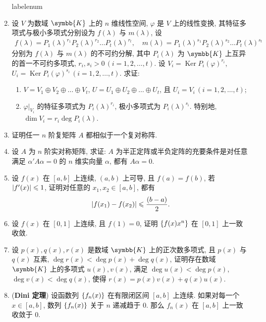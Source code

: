 \documentclass{ctexart}
\makeatletter
\let\set\qty
\let\emph\textbf
\let\le\leqslant
\def\asteriskitem{*}
\def\sitem{%
  \expandafter\let\expandafter\originallabel\csname labelenum\romannumeral\@enumdepth\endcsname
  \expandafter\def\csname labelenum\romannumeral\@enumdepth\expandafter\endcsname\expandafter{%
    \expandafter\bfseries\expandafter\color{red}\expandafter{\expandafter\asteriskitem\expandafter\originallabel}}%
  \item
  \expandafter\let\csname labelenum\romannumeral\@enumdepth\endcsname\originallabel
}
\newcommand{\K}{\ensuremath{\symbb{K}}}
\DeclareMathOperator{\Ker}{Ker}
\makeatother
\begin{document}
\begin{enumerate}[series=exer]
    \sitem 设 $ V $ 为数域 $ \K $ 上的 $ n $ 维线性空间, $ \varphi $ 是 $ V $ 上的线性变换, 其特征多项式与极小多项式分别设为 $ f(\lambda) $ 与 $ m(\lambda) $, 设
    \begin{align*}
        f(\lambda) = P_{1}(\lambda)^{r_{1}}P_{2}(\lambda)^{r_{2}}\dots P_{t}(\lambda)^{r_{t}}, \quad m(\lambda) = P_{1}(\lambda)^{s_{1}}P_{2}(\lambda)^{s_{2}}\dots P_{t}(\lambda)^{s_{t}}
    \end{align*}
    分别为 $ f(\lambda) $ 与 $ m(\lambda) $ 的不可约分解, 其中 $ P_{i}(\lambda) $ 为 $ \K $ 上互异的首一不可约多项式, $ r_{i}, s_{i} > 0\, (i = 1, 2, \dots, t) $. 设 $ V_{i} = \Ker P_{i}(\varphi)^{r_{i}} $, $ U_{i} = \Ker P_{i}(\varphi)^{s_{i}}\,(i = 1, 2, \dots, t) $. 求证:
    \begin{enumerate}
        \item $ V = V_{1} \oplus V_{2} \oplus \dots \oplus V_{t} $, $ U = U_{1} \oplus U_{2} \oplus \dots \oplus U_{t} $, 且 $ U_{i} = V_{i}\,(i = 1, 2, \dots, t) $;
        \item $ \varphi|_{V_{i}} $ 的特征多项式为 $ P_{i}(\lambda)^{r_{i}} $, 极小多项式为 $ P_{i}(\lambda)^{s_{i}} $. 特别地, $ \dim V_{i} = r_{i}\deg P_{i}(\lambda) $. 
    \end{enumerate}
    \item 证明任一 $ n $ 阶复矩阵 $ A $ 都相似于一个复对称阵.
    \item 设 $ A $ 为 $ n $ 阶实对称矩阵, 求证: $ A $ 为半正定阵或半负定阵的充要条件是对任意满足 $ \alpha' A\alpha = 0 $ 的 $ n $ 维实向量 $ \alpha $, 都有 $ A\alpha = 0 $.
    \item 设 $ f(x) $ 在 $ [a, b] $ 上连续, $ (a, b) $ 上可导, 且 $ f(a) = f(b) $, 若 $ \abs{f'(x)} \le 1 $, 证明对任意的 $ x_{1}, x_{2} \in [a, b] $, 都有
    \begin{align*}
        \abs{f(x_{1}) - f(x_{2})} \le \frac{(b - a)}{2}.
    \end{align*}
    \item 设 $ f(x) $ 在 $ [0, 1] $ 上连续, 且 $ f(1) = 0 $, 证明 $ \set{f(x)x^{n}} $ 在 $ [0, 1] $ 上一致收敛.
    \item 设 $ p(x), q(x), r(x) $ 是数域 $ \K $ 上的正次数多项式, 且 $ p(x) $ 与 $ q(x) $ 互素, $ \deg r(x) < \deg p(x) + \deg q(x) $, 证明存在数域 $ \K $ 上的多项式 $ u(x), v(x) $, 满足 $ \deg u(x) < \deg p(x) $, $ \deg v(x) < \deg q(x) $, 使得 $ r(x) = p(x)v(x) + q(x)u(x) $.
    \item (\emph{Dini 定理}) 设函数列 $ \set{f_{n}(x)} $ 在有限闭区间 $ [a, b] $ 上连续. 如果对每一个 $ x\in [a, b] $, 数列 $ \set{f_{n}(x)} $ 关于 $ n $ 递减趋于 $ 0 $. 那么 $ f_{n}(x) $ 在 $ [a, b] $ 上一致收敛于 $ 0 $.

\end{enumerate}
\end{document}

